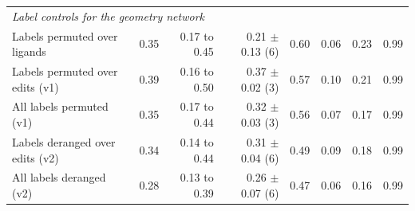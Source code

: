 \begin{table}[t]
{\begin{tabular}{lrrrrrrr}
\midrule
\multicolumn{8}{l}{\emph{Label controls for the geometry network}} \\
\quad Labels permuted over ligands & 0.35 & 0.17 to 0.45 & 0.21 $\pm$ 0.13 (6) & 0.60 & 0.06 & 0.23 & 0.99 \\
\quad Labels permuted over edits (v1) & 0.39 & 0.16 to 0.50 & 0.37 $\pm$ 0.02 (3) & 0.57 & 0.10 & 0.21 & 0.99 \\
\quad All labels permuted (v1) & 0.35 & 0.17 to 0.44 & 0.32 $\pm$ 0.03 (3) & 0.56 & 0.07 & 0.17 & 0.99 \\
\quad Labels deranged over edits (v2) & 0.34 & 0.14 to 0.44 & 0.31 $\pm$ 0.04 (6) & 0.49 & 0.09 & 0.18 & 0.99 \\
\quad All labels deranged (v2) & 0.28 & 0.13 to 0.39 & 0.26 $\pm$ 0.07 (6) & 0.47 & 0.06 & 0.16 & 0.99 \\
\bottomrule
\end{tabular}}
\end{table}
